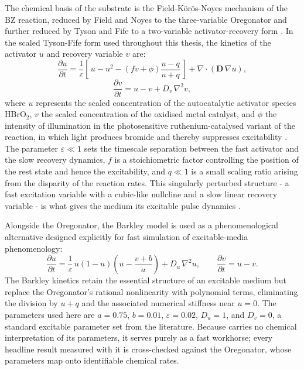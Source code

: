 The chemical basis of the substrate is the Field-K\"or\"os-Noyes mechanism of the BZ reaction, reduced by Field and Noyes to the three-variable Oregonator \cite{field1974oregonator} and further reduced by Tyson and Fife to a two-variable activator-recovery form \cite{tyson1980target, tyson1988singular}. 
In the scaled Tyson-Fife form used throughout this thesis, the kinetics of the activator $u$ and recovery variable $v$ are:
\begin{equation}
\frac{\partial u}{\partial t} = \frac{1}{\varepsilon}\left[\,u - u^{2} - \left(f v + \phi\right)\frac{u - q}{u + q}\,\right] + \nabla\!\cdot\!\left(\mathbf{D}\,\nabla u\right),
\label{eq:oregonator_u}
\end{equation}
\begin{equation}
\frac{\partial v}{\partial t} = u - v + D_{v}\,\nabla^{2} v,
\label{eq:oregonator_v}
\end{equation}
where $u$ represents the scaled concentration of the autocatalytic activator species HBrO$_{2}$, $v$ the scaled concentration of the oxidised metal catalyst, and $\phi$ the intensity of illumination in the photosensitive ruthenium-catalysed variant of the reaction, in which light produces bromide and thereby suppresses excitability \cite{sakurai2002design}. 
The parameter $\varepsilon \ll 1$ sets the timescale separation between the fast activator and the slow recovery dynamics, $f$ is a stoichiometric factor controlling the position of the rest state and hence the excitability, and $q \ll 1$ is a small scaling ratio arising from the disparity of the reaction rates. 
This singularly perturbed structure - a fast excitation variable with a cubic-like nullcline and a slow linear recovery variable - is what gives the medium its excitable pulse dynamics \cite{tyson1988singular}.

Alongside the Oregonator, the Barkley model \cite{barkley1991model} is used as a phenomenological alternative designed explicitly for fast simulation of excitable-media phenomenology:
\begin{equation}
\frac{\partial u}{\partial t} = \frac{1}{\varepsilon}\,u\left(1 - u\right)\left(u - \frac{v + b}{a}\right) + D_{u}\,\nabla^{2}u,
\qquad
\frac{\partial v}{\partial t} = u - v.
\label{eq:barkley}
\end{equation}
The Barkley kinetics retain the essential structure of an excitable medium but replace the Oregonator's rational nonlinearity with polynomial terms, eliminating the division by $u + q$ and the associated numerical stiffness near $u = 0$. 
The parameters used here are $a = 0.75$, $b = 0.01$, $\varepsilon = 0.02$, $D_{u} = 1$, and $D_{v} = 0$, a standard excitable parameter set from the literature. 
Because  carries no chemical interpretation of its parameters, it serves purely as a fast workhorse; every headline result measured with it is cross-checked against the Oregonator, whose parameters map onto identifiable chemical rates.

